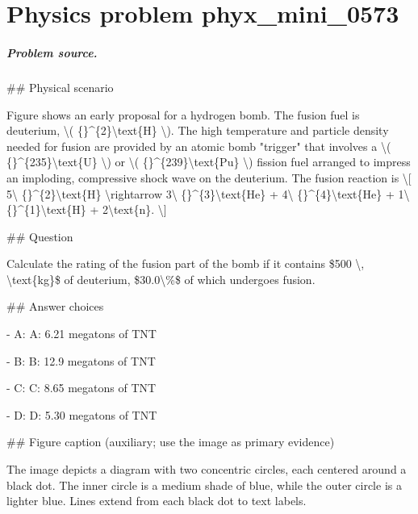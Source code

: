 
\chapter{Physics problem phyx\_mini\_0573}
\label{ch:PhyXMiniProblems_problem_phyx_mini_0573}

\paragraph{Problem source.}
\#\# Physical scenario

Figure shows an early proposal for a hydrogen bomb. The fusion fuel is deuterium, \textbackslash{}( \{\}\textasciicircum{}\{2\}\textbackslash{}text\{H\} \textbackslash{}). The high temperature and particle density needed for fusion are provided by an atomic bomb "trigger" that involves a \textbackslash{}( \{\}\textasciicircum{}\{235\}\textbackslash{}text\{U\} \textbackslash{}) or \textbackslash{}( \{\}\textasciicircum{}\{239\}\textbackslash{}text\{Pu\} \textbackslash{}) fission fuel arranged to impress an imploding, compressive shock wave on the deuterium. The fusion reaction is \textbackslash{}[ 5\textbackslash{} \{\}\textasciicircum{}\{2\}\textbackslash{}text\{H\} \textbackslash{}rightarrow 3\textbackslash{} \{\}\textasciicircum{}\{3\}\textbackslash{}text\{He\} + 4\textbackslash{} \{\}\textasciicircum{}\{4\}\textbackslash{}text\{He\} + 1\textbackslash{} \{\}\textasciicircum{}\{1\}\textbackslash{}text\{H\} + 2\textbackslash{}text\{n\}. \textbackslash{}]

\#\# Question

Calculate the rating of the fusion part of the bomb if it contains \$500 \textbackslash{}, \textbackslash{}text\{kg\}\$ of deuterium, \$30.0\textbackslash{}\%\$ of which undergoes fusion.

\#\# Answer choices

- A: A: 6.21 megatons of TNT

- B: B: 12.9 megatons of TNT

- C: C: 8.65 megatons of TNT

- D: D: 5.30 megatons of TNT

\#\# Figure caption (auxiliary; use the image as primary evidence)

The image depicts a diagram with two concentric circles, each centered around a black dot. The inner circle is a medium shade of blue, while the outer circle is a lighter blue. Lines extend from each black dot to text labels. 

